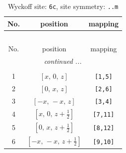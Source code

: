\documentclass[fleqn,8pt]{jsarticle}
\begin{document}
\renewcommand{\arraystretch}{1.2}
\begin{longtable}{ccc}
\caption{Wyckoff site: {\tt 6c}, site symmetry: {\tt ..m}}
 \\
 \hline \hline
No. & position & mapping \\ \hline \endfirsthead

\multicolumn{2}{l}{\tablename\ \thetable{}} \\
 \hline \hline
No. & position & mapping \\ \hline \endhead

 \hline \hline
\multicolumn{2}{r}{\footnotesize\it continued ...} \\ \endfoot

 \hline \hline
\multicolumn{2}{r}{} \\ \endlastfoot

1 & $\left[ x,\, 0,\, z \right]$ & {\tt [1,5]} \\ \hline
2 & $\left[ 0,\, x,\, z \right]$ & {\tt [2,6]} \\ \hline
3 & $\left[ - x,\, - x,\, z \right]$ & {\tt [3,4]} \\ \hline
4 & $\left[ x,\, 0,\, z + \frac{1}{2} \right]$ & {\tt [7,11]} \\ \hline
5 & $\left[ 0,\, x,\, z + \frac{1}{2} \right]$ & {\tt [8,12]} \\ \hline
6 & $\left[ - x,\, - x,\, z + \frac{1}{2} \right]$ & {\tt [9,10]} \\
\end{longtable}
\renewcommand{\arraystretch}{1.2}
\end{document}
